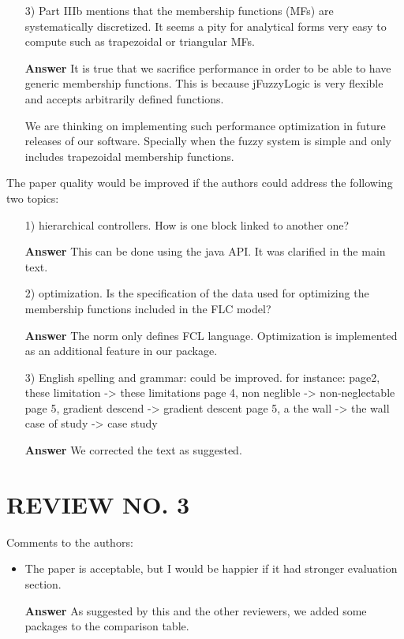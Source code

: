 \documentclass[10pt,a4paper]{article}
\begin{document}
\begin{itemize}
    
   \item[3)] Part IIIb mentions that the membership functions (MFs) are systematically
   discretized. It seems a pity for analytical forms very easy to compute such as
   trapezoidal or triangular MFs.
   
   \item[\textbf{Answer}] It is true that we sacrifice performance in order to be able to have generic membership functions.
   This is because jFuzzyLogic is very flexible and accepts arbitrarily defined functions.

   We are thinking on implementing such performance optimization in future releases of our software. 
   Specially when the fuzzy system is simple and only includes trapezoidal membership functions.
   
\end{itemize}

    The paper quality  would be improved if the authors could address the following
   two topics:

\begin{itemize}   
   \item[1)] hierarchical controllers.
   How is one block linked to another one?
   
   \item[\textbf{Answer}] This can be done using the java API. It was clarified in the main text.
   
   \item[2)] optimization.
   Is the specification of the data used for optimizing
   the membership functions included in the FLC model?

   \item[\textbf{Answer}] The norm only defines FCL language. Optimization is implemented as an additional feature in our package.

   \item[3)] English spelling and grammar: could be improved.
   for instance: page2, these limitation -> these limitations
   page 4, non neglible -> non-neglectable
   page 5, gradient descend -> gradient descent
   page 5, a the wall -> the wall
   case of study -> case study

	\item[\textbf{Answer}] We corrected the text as suggested.
	
\end{itemize}

\section{REVIEW NO. 3}

Comments to the authors:

\begin{itemize}  
   \item The paper is acceptable, but I would be happier if it had stronger evaluation
   section.
   
   	\item[\textbf{Answer}] As suggested by this and the other reviewers, we added some packages to the comparison table.
   	
 \end{itemize}
   
\end{document}
